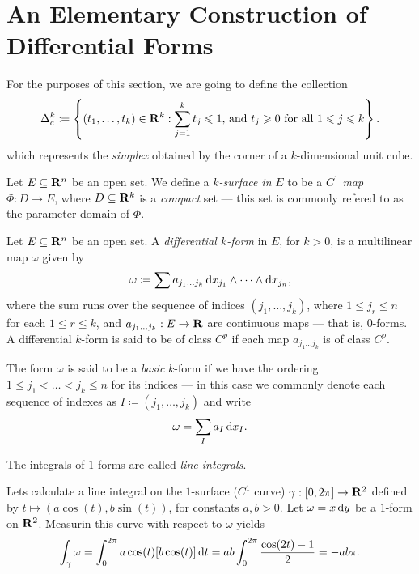 \section{An Elementary Construction of Differential Forms}

\begin{notation}
For the purposes of this section, we are going to define the collection
\[
  \Delta_c^k \coloneq \left\{
    (t_{1}, \dots, t_k) \in \mathbf{R}^k :
    \sum_{j=1}^k t_j \leqslant 1 \text{, and }
    t_j \geqslant 0 \text{ for all } 1 \leqslant j \leqslant k
  \right\}.
\]
which represents the \emph{simplex} obtained by the corner of a
\(k\)-dimensional unit cube.
\end{notation}

\begin{definition}[\(k\)-surface]
\label{def:k-surface-Rn}
Let \(E \subseteq \mathbf{R}^n\) be an open set. We define a \emph{\(k\)-surface in}
\(E\) to be a \(C^1\) \emph{map} \(\Phi: D \to E\), where \(D \subseteq \mathbf{R}^k\)
is a \emph{compact} set --- this set is commonly refered to as the parameter
domain of \(\Phi\).
\end{definition}

\begin{definition}
Let \(E \subseteq \mathbf{R}^n\) be an open set. A \emph{differential \(k\)-form} in
\(E\), for \(k > 0\), is a multilinear map \(\omega\) given by
\[
  \omega \coloneq \sum a_{j_1 \dots j_k}\,
  \mathrm{d} x_{j_1} \wedge \dots \wedge \mathrm{d} x_{j_n},
\]
where the sum runs over the sequence of indices \((j_1, \dots, j_k)\), where \(1
\leq j_r \leq n\) for each \(1 \leq r \leq k\), and \(a_{j_1 \dots j_k}: E \to
\mathbf{R}\) are continuous maps --- that is, \(0\)-forms. A differential \(k\)-form is
said to be of class \(C^p\) if each map \(a_{j_1 \dots j_k}\) is of class
\(C^p\).

The form \(\omega\) is said to be a \emph{basic} \(k\)-form if we have the
ordering \(1 \leq j_1 < \dots < j_k \leq n\) for its indices --- in this case we
commonly denote each sequence of indexes as \(I \coloneq (j_1, \dots, j_k)\) and
write
\[
  \omega = \sum_I a_{I}\, \mathrm{d} x_{I}.
\]
\end{definition}

\begin{definition}
\label{def:line-integral}
The integrals of \(1\)-forms are called \emph{line integrals}.
\end{definition}

\begin{example}
Lets calculate a line integral on the \(1\)-surface (\(C^1\) curve)
\(\gamma: [0, 2 \pi] \to \mathbf{R}^2\) defined by \(t \mapsto (a \cos(t), b \sin(t))\),
for constants \(a, b > 0\). Let \(\omega = x\, \mathrm{d} y\) be a \(1\)-form on
\(\mathbf{R}^2\). Measurin this curve with respect to \(\omega\) yields
\[
  \int_{\gamma} \omega = \int_0^{2\pi} a \cos(t) [b \cos(t)]\, \mathrm{d} t
  = ab \int_0^{2 \pi} \frac{\cos(2t) - 1}{2} = - ab \pi.
\]
\end{example}

